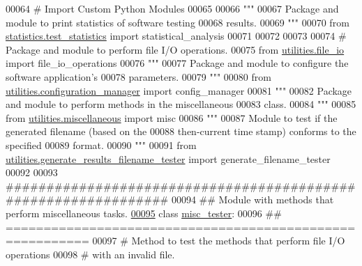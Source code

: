 \begin{DoxyCode}
00064 \textcolor{comment}{#   Import Custom Python Modules}
00065 
00066 \textcolor{stringliteral}{"""}
00067 \textcolor{stringliteral}{    Package and module to print statistics of software testing}
00068 \textcolor{stringliteral}{        results.}
00069 \textcolor{stringliteral}{"""}
00070 \textcolor{keyword}{from} \hyperlink{namespacestatistics_1_1test__statistics}{statistics.test\_statistics} \textcolor{keyword}{import} statistical\_analysis
00071 
00072 
00073 
00074 \textcolor{comment}{# Package and module to perform file I/O operations.}
00075 \textcolor{keyword}{from} \hyperlink{namespaceutilities_1_1file__io}{utilities.file\_io} \textcolor{keyword}{import} file\_io\_operations
00076 \textcolor{stringliteral}{"""}
00077 \textcolor{stringliteral}{    Package and module to configure the software application's}
00078 \textcolor{stringliteral}{        parameters.}
00079 \textcolor{stringliteral}{"""}
00080 \textcolor{keyword}{from} \hyperlink{namespaceutilities_1_1configuration__manager}{utilities.configuration\_manager} \textcolor{keyword}{import} config\_manager
00081 \textcolor{stringliteral}{"""}
00082 \textcolor{stringliteral}{    Package and module to perform methods in the miscellaneous}
00083 \textcolor{stringliteral}{        class.}
00084 \textcolor{stringliteral}{"""}
00085 \textcolor{keyword}{from} \hyperlink{namespaceutilities_1_1miscellaneous}{utilities.miscellaneous} \textcolor{keyword}{import} misc
00086 \textcolor{stringliteral}{"""}
00087 \textcolor{stringliteral}{    Module to test if the generated filename (based on the}
00088 \textcolor{stringliteral}{        then-current time stamp) conforms to the specified}
00089 \textcolor{stringliteral}{        format.}
00090 \textcolor{stringliteral}{"""}
00091 \textcolor{keyword}{from} \hyperlink{namespaceutilities_1_1generate__results__filename__tester}{utilities.generate\_results\_filename\_tester} \textcolor{keyword}{import} 
      generate\_filename\_tester
00092 
00093 \textcolor{comment}{###############################################################}
00094 \textcolor{comment}{##  Module with methods that perform miscellaneous tasks.}
\hypertarget{miscellaneous__tester_8py_source_l00095}{}\hyperlink{classutilities_1_1miscellaneous__tester_1_1misc__tester}{00095} \textcolor{keyword}{class }\hyperlink{classutilities_1_1miscellaneous__tester_1_1misc__tester}{misc\_tester}:
00096     \textcolor{comment}{## =========================================================}
00097     \textcolor{comment}{#   Method to test the methods that perform file I/O operations}
00098     \textcolor{comment}{#       with an invalid file.}

\end{DoxyCode}
